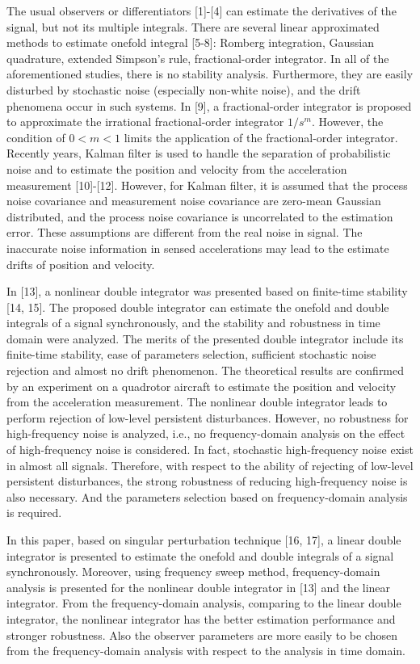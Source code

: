 \documentclass[10pt,journal]{IEEEtran}
\begin{document}
The usual observers or differentiators [1]-[4] can estimate the derivatives
of the signal, but not its multiple integrals. There are several linear
approximated methods to estimate onefold integral [5-8]: Romberg
integration, Gaussian quadrature, extended Simpson's rule, fractional-order
integrator. In all of the aforementioned studies, there is no stability
analysis. Furthermore, they are easily disturbed by stochastic noise
(especially non-white noise), and the drift phenomena occur in such systems.
In [9], a fractional-order integrator is proposed to approximate the
irrational fractional-order integrator $1/s^{m}$. However, the condition of $0<m<1$ limits the application of the fractional-order integrator. Recently
years, Kalman filter is used to handle the separation of probabilistic noise
and to estimate the position and velocity from the acceleration measurement
[10]-[12]. However, for Kalman filter, it is assumed that the process noise
covariance and measurement noise covariance are zero-mean Gaussian
distributed, and the process noise covariance is uncorrelated to the
estimation error. These assumptions are different from the real noise in
signal. The inaccurate noise information in sensed accelerations may lead to
the estimate drifts of position and velocity.

In [13], a nonlinear double integrator was presented based on finite-time
stability [14, 15]. The proposed double integrator can estimate the onefold
and double integrals of a signal synchronously, and the stability and
robustness in time domain were analyzed. The merits of the presented double
integrator include its finite-time stability, ease of parameters selection,
sufficient stochastic noise rejection and almost no drift phenomenon. The
theoretical results are confirmed by an experiment on a quadrotor aircraft
to estimate the position and velocity from the acceleration measurement. The
nonlinear double integrator leads to perform rejection of low-level
persistent disturbances. However, no robustness for high-frequency noise is
analyzed, i.e., no frequency-domain analysis on the effect of high-frequency
noise is considered. In fact, stochastic high-frequency noise exist in
almost all signals. Therefore, with respect to the ability of rejecting of
low-level persistent disturbances, the strong robustness of reducing
high-frequency noise is also necessary. And the parameters selection based
on frequency-domain analysis is required.

In this paper, based on singular perturbation technique [16, 17], a linear
double integrator is presented to estimate the onefold and double integrals
of a signal synchronously. Moreover, using frequency sweep method,
frequency-domain analysis is presented for the nonlinear double integrator
in [13] and the linear integrator. From the frequency-domain analysis,
comparing to the linear double integrator, the nonlinear integrator has the
better estimation performance and stronger robustness. Also the observer
parameters are more easily to be chosen from the frequency-domain analysis
with respect to the analysis in time domain.
\end{document}

